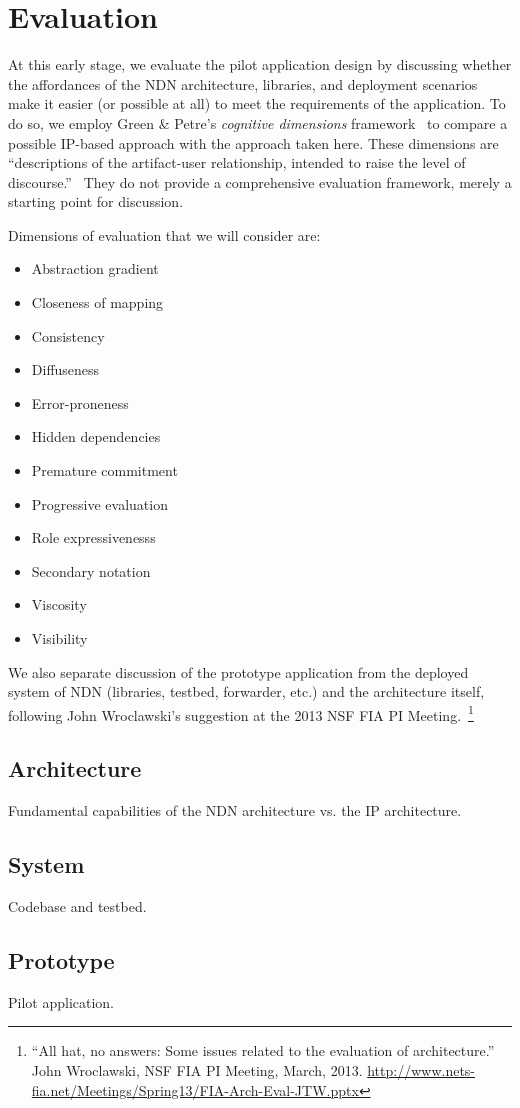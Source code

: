 \section{Evaluation}

At this early stage, we evaluate the pilot application design by discussing whether the affordances of the NDN architecture, libraries, and deployment scenarios make it easier (or possible at all) to meet the requirements of the application. To do so, we employ Green \& Petre's \emph{cognitive dimensions} framework~\cite{green1996usability} to compare a possible IP-based approach with the approach taken here. These dimensions are ``descriptions of the artifact-user relationship, intended to raise the level of discourse.''~\cite{Green1989} They do not provide a comprehensive evaluation framework, merely a starting point for discussion.  

Dimensions of evaluation that we will consider are:
\begin{itemize}
\item Abstraction gradient
\item Closeness of mapping
\item Consistency
\item Diffuseness
\item Error-proneness
\item Hidden dependencies
\item Premature commitment
\item Progressive evaluation
\item Role expressivenesss
\item Secondary notation
\item Viscosity
\item Visibility
\end{itemize}

We also separate discussion of the prototype application from the deployed system of NDN (libraries, testbed, forwarder, etc.) and the architecture itself, following John Wroclawski's suggestion at the 2013 NSF FIA PI Meeting.~\footnote{``All hat, no answers: Some issues related to the evaluation of architecture.'' John Wroclawski, NSF FIA PI Meeting, March, 2013. \url{http://www.nets-fia.net/Meetings/Spring13/FIA-Arch-Eval-JTW.pptx}}

\subsection{Architecture}

Fundamental capabilities of the NDN architecture vs. the IP architecture. 

\subsection{System}

Codebase and testbed. 

\subsection{Prototype}

Pilot application. 



